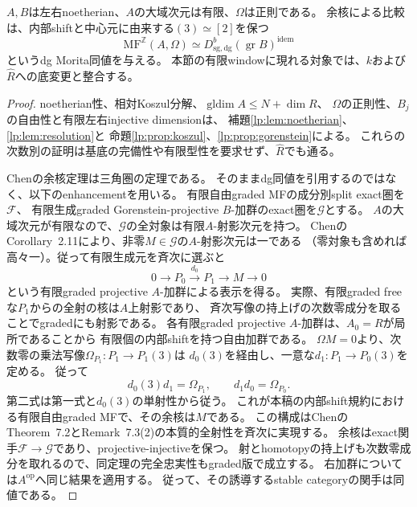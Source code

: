 \begin{lemma}\label{tw:lem:stabilization}
$A,B$は左右noetherian、$A$の大域次元は有限、$\Omega$は正則である。
余核による比較は、内部shiftと中心元に由来する$(3)\simeq[2]$を保つ
\begin{equation}\label{tw:eq:stabilization}
 \mathrm{MF}^{\mathbb Z}(A,\Omega)
 \simeq D^b_{\mathrm{sg,dg}}(\operatorname{gr}B)^{\mathrm{idem}}
\end{equation}
というdg Morita同値を与える。
本節の有限windowに現れる対象では、$k$および$\widehat R$への底変更と整合する。
\end{lemma}
\begin{proof}
noetherian性、相対Koszul分解、$\operatorname{gldim}A\le N+\dim R$、
$\Omega$の正則性、$B_j$の自由性と有限左右injective dimensionは、
補題\ref{lp:lem:noetherian}、\ref{lp:lem:resolution}と
命題\ref{lp:prop:koszul}、\ref{lp:prop:gorenstein}による。
これらの次数別の証明は基底の完備性や有限型性を要求せず、$\widehat R$でも通る。

Chenの余核定理\cite[Theorem~7.2]{AMChen}は三角圏の定理である。
そのままdg同値を引用するのではなく、以下のenhancementを用いる。
有限自由graded MFの成分別split exact圏を$\mathcal F$、
有限生成graded Gorenstein-projective $B$-加群のexact圏を$\mathcal G$とする。
$A$の大域次元が有限なので、$\mathcal G$の全対象は有限$A$-射影次元を持つ。
ChenのCorollary~2.11により、非零$M\in\mathcal G$の$A$-射影次元は一である
（零対象も含めれば高々一）。従って有限生成元を斉次に選ぶと
\begin{equation}\label{tw:eq:graded-presentation}
 0\longrightarrow P_0\xrightarrow{d_0}P_1\longrightarrow M\longrightarrow0
\end{equation}
という有限graded projective $A$-加群による表示を得る。
実際、有限graded freeな$P_1$からの全射の核は$A$上射影であり、
斉次写像の持上げの次数零成分を取ることでgradedにも射影である。
各有限graded projective $A$-加群は、$A_0=R$が局所であることから
有限個の内部shiftを持つ自由加群である。
$\Omega M=0$より、次数零の乗法写像$\Omega_{P_1}:P_1\to P_1(3)$は
$d_0(3)$を経由し、一意な$d_1:P_1\to P_0(3)$を定める。
従って
\begin{equation}\label{tw:eq:graded-factorization}
 d_0(3)d_1=\Omega_{P_1},\qquad d_1d_0=\Omega_{P_0}.
\end{equation}
第二式は第一式と$d_0(3)$の単射性から従う。
これが本稿の内部shift規約における有限自由graded MFで、その余核は$M$である。
この構成はChenのTheorem~7.2とRemark~7.3(2)の本質的全射性を斉次に実現する。
余核はexact関手$\mathcal F\to\mathcal G$であり、projective-injectiveを保つ。
射とhomotopyの持上げも次数零成分を取れるので、同定理の完全忠実性もgraded版で成立する。
右加群については$A^{\mathrm{op}}$へ同じ結果を適用する。
従って、その誘導するstable categoryの関手は同値である。


\end{proof}
